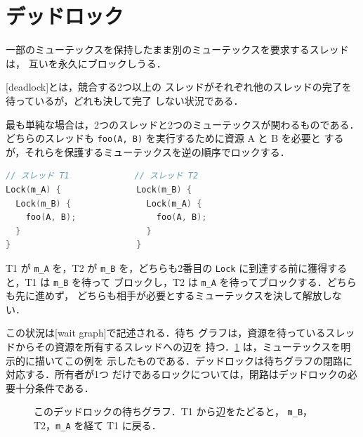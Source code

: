 \documentclass[../main.tex]{subfiles}
\begin{document}
\section{デッドロック}
\label{sec:l03-deadlock}

一部のミューテックスを保持したまま別のミューテックスを要求するスレッドは，
互いを永久にブロックしうる．

\begin{definition}[デッドロック]
  [deadlock]とは，競合する2つ以上の
  スレッドがそれぞれ他のスレッドの完了を待っているが，どれも決して完了
  しない状況である．
\end{definition}

最も単純な場合は，2つのスレッドと2つのミューテックスが関わるものである．
どちらのスレッドも \texttt{foo(A, B)} を実行するために資源 A と B を必要と
するが，それらを保護するミューテックスを逆の順序でロックする．
\begin{lstlisting}[language=C, numbers=none]
// スレッド T1             // スレッド T2
Lock(m_A) {               Lock(m_B) {
  Lock(m_B) {               Lock(m_A) {
    foo(A, B);                foo(A, B);
  }                         }
}                         }
\end{lstlisting}
T1 が \texttt{m\_A} を，T2 が \texttt{m\_B} を，どちらも2番目の
\texttt{Lock} に到達する前に獲得すると，T1 は \texttt{m\_B} を待って
ブロックし，T2 は \texttt{m\_A} を待ってブロックする．どちらも先に進めず，
どちらも相手が必要とするミューテックスを決して解放しない．

この状況は[wait graph]で記述される．待ち
グラフは，資源を待っているスレッドからその資源を所有するスレッドへの辺を
持つ．\cref{fig:l03-wait-graph} は，ミューテックスを明示的に描いてこの例を
示したものである．デッドロックは待ちグラフの閉路に対応する．所有者が1つ
だけであるロックについては，閉路はデッドロックの必要十分条件である．

\begin{figure}[htbp]
  \centering
  
  \caption{このデッドロックの待ちグラフ．T1 から辺をたどると，
    \texttt{m\_B}，T2，\texttt{m\_A} を経て T1 に戻る．}
  \label{fig:l03-wait-graph}
\end{figure}
\end{document}
